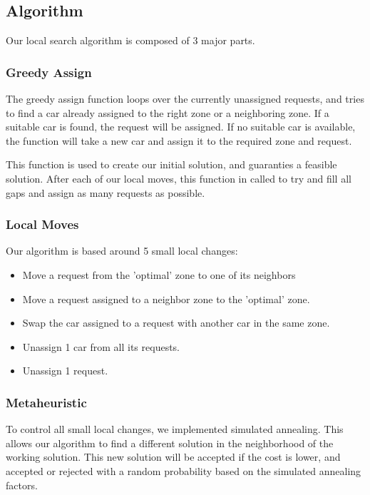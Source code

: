 \documentclass[11pt,a4paper]{article}
\begin{document}
    \subsection{Algorithm}

        Our local search algorithm is composed of 3 major parts.

        \subsubsection{Greedy Assign}
            The greedy assign function loops over the currently unassigned requests, and tries to find a car already assigned to the right zone or a neighboring zone.
            If a suitable car is found, the request will be assigned.
            If no suitable car is available, the function will take a new car and assign it to the required zone and request.

            This function is used to create our initial solution, and guaranties a feasible solution.
            After each of our local moves, this function in called to try and fill all gaps and assign as many requests as possible.

        \subsubsection{Local Moves}
            Our algorithm is based around 5 small local changes:
            \begin{itemize} \itemsep-0.5em
                \item Move a request from the 'optimal' zone to one of its neighbors
                \item Move a request assigned to a neighbor zone to the 'optimal' zone.
                \item Swap the car assigned to a request with another car in the same zone.
                \item Unassign 1 car from all its requests.
                \item Unassign 1 request.
            \end{itemize}

        \subsubsection{Metaheuristic}\label{subsec:metaheuristic}
            To control all small local changes, we implemented simulated annealing.
            This allows our algorithm to find a different solution in the neighborhood of the working solution.
            This new solution will be accepted if the cost is lower, and accepted or rejected with a random probability based on the simulated annealing factors.
            
\end{document}
